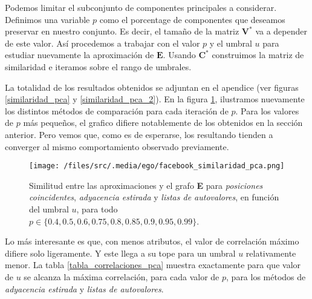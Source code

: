 Podemos limitar el subconjunto de componentes principales a considerar.
Definimos una variable $p$ como el porcentage de componentes que deseamos preservar en nuestro conjunto.
Es decir, el tamaño de la matriz $\textbf{V}^*$ va a depender de este valor.
Así procedemos a trabajar con el valor $p$ y el umbral $u$ para estudiar nuevamente la aproximación de $\textbf{E}$.
Usando $\textbf{C}^*$ construimos la matriz de similaridad e iteramos sobre el rango de umbrales.

\vspace{1em}
La totalidad de los resultados obtenidos se adjuntan en el apendice (ver figuras \ref{similaridad_pca} y \ref{similaridad_pca_2}). 
En la figura \ref{grafo_correlaciones_pca}, ilustramos nuevamente los distintos métodos de comparación para cada iteración de $p$.
Para los valores de $p$ más pequeños, el grafico difiere notablemente de los obtenidos en la sección anterior. 
Pero vemos que, como es de esperarse, los resultando tienden a converger al mismo comportamiento observado previamente.

\begin{figure}[!htbp]
    \centering
    \texttt{[image: /files/src/.media/ego/facebook\_similaridad\_pca.png]}
    \caption{Similitud entre las aproximaciones y el grafo \textbf{E} para \textit{posiciones coincidentes}, \textit{adyacencia estirada} y \textit{listas de autovalores}, en función del umbral $u$, para todo $p \in \{0.4, 0.5, 0.6, 0.75, 0.8, 0.85, 0.9, 0.95, 0.99\}$.}
    \label{grafo_correlaciones_pca}
\end{figure}

\vspace{1em}
Lo más interesante es que, con menos atributos, el valor de correlación máximo difiere solo ligeramente.
Y este llega a su tope para un umbral $u$ relativamente menor.
La tabla \ref{tabla_correlaciones_pca} muestra exactamente para que valor de $u$ se alcanza la máxima correlación, para cada valor de $p$, para los métodos de \textit{adyacencia estirada} y \textit{listas de autovalores}.

